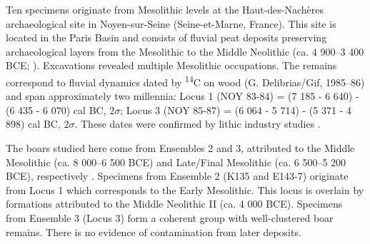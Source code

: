\documentclass[12pt,a4paper]{article}
\begin{document}
Ten specimens originate from Mesolithic levels at the Haut-des-Nachères archaeological site in Noyen-sur-Seine (Seine-et-Marne, France). This site is located in the Paris Basin and consists of fluvial peat deposits preserving archaeological layers from the Mesolithic to the Middle Neolithic (ca. 4 900–3 400 BCE; \cite{marinval-vigneArcheologiePaleoenvironnementNoyenSeine1993g,mordantNoyenSeineVingtcinqAns2013d}). Excavations revealed multiple Mesolithic occupations. The remains correspond to fluvial dynamics dated by \textsuperscript{14}C on wood (G. Delibrias/Gif, 1985–86) and span approximately two millennia: Locus 1 (NOY 83-84) = (7 185 - 6 640) - (6 435 - 6 070) cal BC, $2\sigma$; Locus 3 (NOY 85-87) = (6 064 - 5 714) - (5 371 - 4 898) cal BC, $2\sigma$. These dates were confirmed by lithic industry studies \cite{gueretLoutillagePremierMesolithique2013,
deseineNouveauRegardOccupations2019}. 

The boars studied here come from Ensembles 2 and 3, attributed to the Middle Mesolithic (ca. 8 000–6 500 BCE) and Late/Final Mesolithic (ca. 6 500–5 200 BCE), respectively \cite{davidModelisationVegetationHolocene2014d}. Specimens from Ensemble 2 (K135 and E143-7) originate from Locus 1 which corresponds to the Early Mesolithic. This locus is overlain by formations attributed to the Middle Neolithic II (ca. 4 000 BCE). Specimens from Ensemble 3 (Locus 3) form a coherent group with well-clustered boar remains. There is no evidence of contamination from later deposits. 
\end{document}
